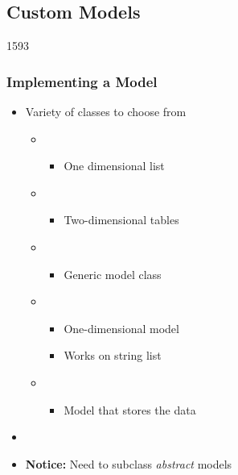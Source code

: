 %
%
%
%

\subsection{Custom Models}

\begin{slide}{1593}\frametitle{Implementing a Model}
\begin{itemize}
\item Variety of classes to choose from
  \begin{itemize}
  \item {}
    \begin{itemize}
    \item One dimensional list
    \end{itemize}
  \item {}
    \begin{itemize}
    \item Two-dimensional tables
    \end{itemize}
  \item {}
    \begin{itemize}
    \item Generic model class
    \end{itemize}
  \item {}
    \begin{itemize}
    \item One-dimensional model
    \item Works on string list
    \end{itemize}
  \item {}
    \begin{itemize}
    \item Model that stores the data
    \end{itemize}
 \end{itemize}
\item[]
\item \textbf{Notice:} Need to subclass \textit{abstract} models
\end{itemize}
\end{slide}

